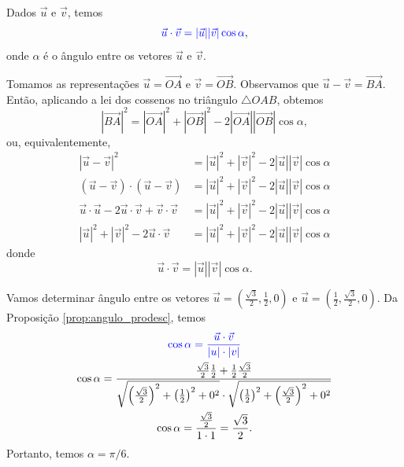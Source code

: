 \begin{prop}\label{prop:angulo_prodesc}
  Dados $\vec{u}$ e $\vec{v}$, temos
  \begin{equation}\label{eq:prodesc_eq}
    {\color{blue}\vec{u}\cdot\vec{v}=|\vec{u}||\vec{v}|\cos\alpha},
  \end{equation}
  onde $\alpha$ é o ângulo entre os vetores $\vec{u}$ e $\vec{v}$.
\end{prop}
\begin{dem}
  Tomamos as representações $\vec{u} = \overrightarrow{OA}$ e $\vec{v} = \overrightarrow{OB}$. Observamos que $\vec{u}-\vec{v} = \overrightarrow{BA}$. Então, aplicando a lei dos cossenos no triângulo $\triangle OAB$, obtemos
  \begin{equation}
    |\overrightarrow{BA}|^2 = |\overrightarrow{OA}|^2 + |\overrightarrow{OB}|^2 - 2|\overrightarrow{OA}||\overrightarrow{OB}|\cos\alpha,
  \end{equation}
  ou, equivalentemente,
  \begin{align}
    |\vec{u}-\vec{v}|^2 &= |\vec{u}|^2+|\vec{v}|^2-2|\vec{u}||\vec{v}|\cos\alpha\\
    (\vec{u}-\vec{v})\cdot(\vec{u}-\vec{v}) &= |\vec{u}|^2+|\vec{v}|^2-2|\vec{u}||\vec{v}|\cos\alpha\\
    \vec{u}\cdot\vec{u}-2\vec{u}\cdot\vec{v}+\vec{v}\cdot\vec{v} &= |\vec{u}|^2+|\vec{v}|^2-2|\vec{u}||\vec{v}|\cos\alpha\\
    |\vec{u}|^2+|\vec{v}|^2-2\vec{u}\cdot\vec{v} &= |\vec{u}|^2+|\vec{v}|^2-2|\vec{u}||\vec{v}|\cos\alpha
  \end{align}
  donde
  \begin{equation}
    \vec{u}\cdot\vec{v} = |\vec{u}||\vec{v}|\cos\alpha.
  \end{equation}
\end{dem}

\begin{ex}
  Vamos determinar ângulo entre os vetores $\displaystyle \vec{u}=\left(\frac{\sqrt{3}}{2},\frac{1}{2},0\right)$ e $\displaystyle \vec{u}=\left(\frac{1}{2},\frac{\sqrt{3}}{2},0\right)$. Da Proposição \ref{prop:angulo_prodesc}, temos
  \begin{gather}
    {\color{blue}\cos\alpha = \frac{\vec{u}\cdot\vec{v}}{|u|\cdot|v|}}\\
    \cos\alpha = \frac{\frac{\sqrt{3}}{2}\frac{1}{2}+\frac{1}{2}\frac{\sqrt{3}}{2}}{\sqrt{\left(\frac{\sqrt{3}}{2}\right)^2+\left(\frac{1}{2}\right)^2+0^2}\cdot \sqrt{\left(\frac{1}{2}\right)^2+\left(\frac{\sqrt{3}}{2}\right)^2+0^2}}\\
    \cos\alpha = \frac{\frac{\sqrt{3}}{2}}{1\cdot 1} = \frac{\sqrt{3}}{2}.
  \end{gather}
  Portanto, temos $\alpha = \pi/6$.
\end{ex}

